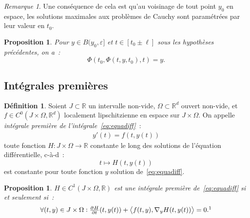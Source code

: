 \documentclass{report}
\newtheorem{prp}[thm]{Proposition}
\theoremstyle{definition}
\newtheorem{déf}[thm]{Définition}
\theoremstyle{remark}
\newtheorem*{rmq}{Remarque}
\numberwithin{equation}{section}
\newcommand{\R}{\mathbb R}
\newcommand{\scpr}[2]{\left\langle #1, #2\right\rangle}
\begin{document}
			\begin{rmq} Une conséquence de cela est qu'au voisinage de tout point $y_0$ en espace, les solutions maximales aux problèmes de Cauchy sont
			paramétrées par leur valeur en $t_0$.
			\end{rmq}

			\begin{prp}  Pour $y \in B(y_0, \varepsilon]$ et $t \in [t_0 \pm \ell]$ sous les hypothèses précédentes, on a~:
			\begin{equation}
				\Phi\left(t_0, \Phi(t, y, t_0), t\right) = y.
			\end{equation}
			\end{prp}

		\subsection{Intégrales premières}
			\begin{déf} Soient $J \subset \R$ un intervalle non-vide, $\Omega \subset \R^d$ ouvert non-vide, et $f \in C^0(J \times \Omega, \R^d)$ localement
			lipschitzienne en espace sur $J \times \Omega$. On appelle \textit{intégrale première de l'intégrale~\eqref{eq:equadiff}}~:
			\begin{align}\label{eq:equadiff}
				y'(t) = f(t, y(t))
			\end{align}
			toute fonction $H : J \times \Omega \to \R$ constante le long des solutions de l'équation différentielle, c-à-d~:
			\begin{equation}
				t \mapsto H(t, y(t))
			\end{equation}
			est constante pour toute fonction $y$ solution de~\eqref{eq:equadiff}.
			\end{déf}

			\begin{prp} $H \in C^1(J \times \Omega, \R)$ est une intégrale première de~\eqref{eq:equadiff} si et seulement si~:
			\begin{equation}
				\forall (t, y) \in J \times \Omega : \pd Ht(t, y(t)) + \scpr {f(t, y)}{\nabla_yH(t, y(t))} = 0.\footnotemark
			\end{equation}
			\end{prp}		
\end{document}
